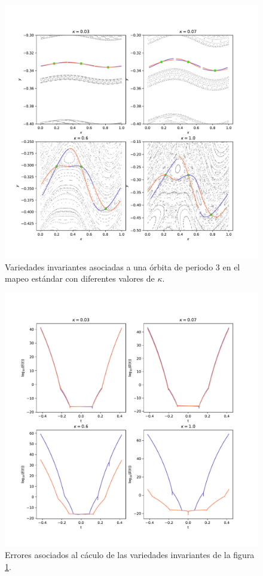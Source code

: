 \begin{figure}[H]
	\centering
	\includegraphics[scale=0.7]{variedadesestandarperiodo3}
	\caption{Variedades invariantes asociadas a una \'orbita de periodo 3 en el mapeo est\'andar con diferentes valores de $\kappa$.}
	\label{variedadesestandarperiodo3}
\end{figure}
\begin{figure}[H]
	\centering
	\includegraphics[scale=0.7]{erroresvariedadesestandarperiodo3}
	\caption{Errores asociados al c\'aculo de las variedades invariantes de la figura \ref{variedadesestandarperiodo3}. }
	\label{erroresvariedadesperiodo3}
\end{figure}

